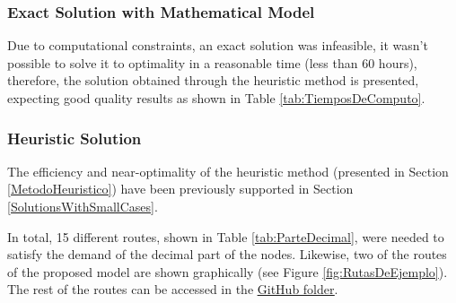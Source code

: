 \documentclass{amsart}
\begin{document}
            \subsubsection{Exact Solution with Mathematical Model}
            Due to computational constraints, an exact solution was infeasible, it wasn't possible to solve it to optimality in a reasonable time (less than 60 hours), therefore, the solution obtained through the heuristic method is presented, expecting good quality results as shown in Table \ref{tab:TiemposDeComputo}.
            
            \subsubsection{Heuristic Solution}
            The efficiency and near-optimality of the heuristic method (presented in Section \ref{MetodoHeuristico}) have been previously supported in Section \ref{SolutionsWithSmallCases}.
            
            In total, 15 different routes, shown in Table \ref{tab:ParteDecimal}, were needed to satisfy the demand of the decimal part of the nodes. Likewise, two of the routes of the proposed model are shown graphically (see Figure \ref{fig:RutasDeEjemplo}). The rest of the routes can be accessed in the \href{https://github.com/JuanjoBelt/VRP-ReforestationTransportLogistics/tree/5030293089820a896e177f198d9ab7f23ada59e7/Resources/RouteImages}{\underline{GitHub folder}}.
            
\end{document}
